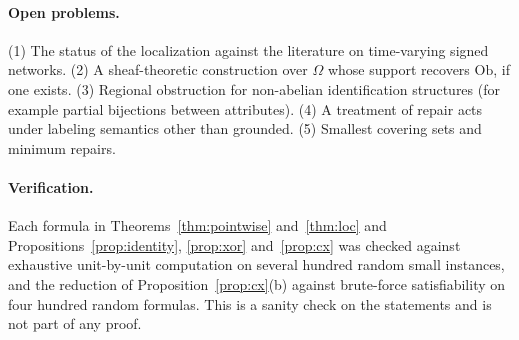 \documentclass[11pt]{article}
\theoremstyle{plain}
\theoremstyle{definition}
\theoremstyle{remark}
\newcommand{\Om}{\Omega}
\newcommand{\Ob}{\mathrm{Ob}}
\begin{document}
\paragraph{Open problems.} (1) The status of the localization against the literature on time-varying signed networks. (2) A sheaf-theoretic construction over $\Om$ whose support recovers $\Ob$, if one exists. (3) Regional obstruction for non-abelian identification structures (for example partial bijections between attributes). (4) A treatment of repair acts under labeling semantics other than grounded. (5) Smallest covering sets and minimum repairs.

\paragraph{Verification.} Each formula in Theorems~\ref{thm:pointwise} and~\ref{thm:loc} and Propositions~\ref{prop:identity}, \ref{prop:xor} and~\ref{prop:cx} was checked against exhaustive unit-by-unit computation on several hundred random small instances, and the reduction of Proposition~\ref{prop:cx}(b) against brute-force satisfiability on four hundred random formulas. This is a sanity check on the statements and is not part of any proof.
\end{document}
